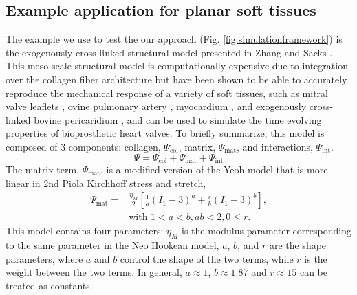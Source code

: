 
\subsection{Example application for planar soft tissues}

	The example we use to test the our approach (Fig. \ref{fig:simulationframework}) is the exogenously cross-linked structural model presented in Zhang and Sacks \cite{zhang_modeling_2017}. This meso-scale structural model is computationally expensive due to integration over the collagen fiber architecture but have been shown to be able to accurately reproduce the mechanical response of a variety of soft tissues, such as mitral valve leaflets \cite{zhang_meso_2016}, ovine pulmonary artery \cite{fata_insights_2014}, myocardium \cite{avazmohammadi_novel_2017}, and exogenously cross-linked bovine pericaridium \cite{sacks_novel_2016}, and can be used to simulate the time evolving properties of bioprosthetic heart valves. To briefly summarize, this model is composed of 3 components: collagen, $\Psi_\mathrm{col}$, matrix, $\Psi_\mathrm{mat}$, and interactions, $\Psi_\mathrm{int}$. 
\begin{equation}
\Psi 	= \Psi_\mathrm{col} + \Psi_\mathrm{mat} + \Psi_\mathrm{int} \label{eqn:structuralmodelcomponents}
\end{equation}
The matrix term, $\Psi_\mathrm{mat}$, is a modified version of the Yeoh model that is more linear in 2nd Piola Kirchhoff stress and stretch, 
\begin{equation}\label{eqn:matrixmodel}
\begin{aligned}
\Psi_\mathrm{mat} = &\frac{\eta_M}{2} \left[ \frac{1}{a}\left( I_1 -3\right)^{a} + \frac{r}{b} \left( I_1 -3\right)^{b} \right], \\
&\text{with } 1<a<b, ab <2, 0 \leq r.
\end{aligned}
\end{equation}
This model contains four parameters: $\eta_M$ is the modulus parameter corresponding to the same parameter in the Neo Hookean model, $a$, $b$, and $r$ are the shape parameters, where $a$ and $b$ control the shape of the two terms, while $r$ is the weight between the two terms. In general, $a \approx 1$, $b \approx 1.87$ and $r \approx 15$ can be treated as constants. 



